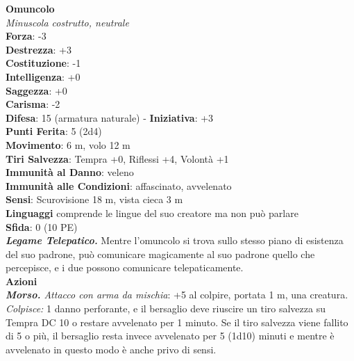 \begin{multicols}{2}
\medskip\textbf{Omuncolo}\\
\emph{Minuscola costrutto, neutrale}\\
\textbf{Forza}: -3\\
\textbf{Destrezza}: +3\\
\textbf{Costituzione}: -1\\
\textbf{Intelligenza}: +0\\
\textbf{Saggezza}: +0\\
\textbf{Carisma}: -2\\
\textbf{Difesa}: 15 (armatura naturale) - \textbf{Iniziativa}: +3\\
\textbf{Punti Ferita}: 5 (2d4)\\
\textbf{Movimento}: 6 m, volo 12 m\\
\textbf{Tiri Salvezza}:  Tempra +0, Riflessi +4, Volontà +1\\
\textbf{Immunità al Danno}: veleno\\
\textbf{Immunità alle Condizioni}: affascinato, avvelenato\\
\textbf{Sensi}: Scurovisione 18 m, vista cieca 3 m\\
\textbf{Linguaggi} comprende le lingue del suo creatore ma non può parlare\\
\textbf{Sfida}: 0 (10 PE)\smallskip\\
\emph{\textbf{Legame Telepatico.}} Mentre l'omuncolo si trova sullo stesso piano di esistenza del suo padrone, può comunicare magicamente al suo padrone quello che percepisce, e i due possono comunicare telepaticamente.\\
\smallskip\textbf{Azioni}\\
\emph{\textbf{Morso.} Attacco con arma da mischia}: +5 al colpire, portata 1 m, una creatura.\\
\emph{Colpisce:} 1 danno perforante, e il bersaglio deve riuscire un tiro salvezza su Tempra DC 10 o restare avvelenato per 1 minuto. Se il tiro salvezza viene fallito di 5 o più, il bersaglio resta invece avvelenato per 5 (1d10) minuti e mentre è avvelenato in questo modo è anche privo di sensi.\\


\end{multicols}
